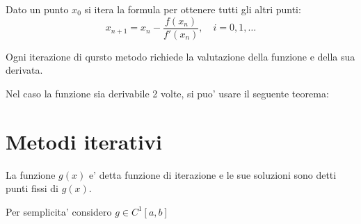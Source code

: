 Dato un punto $x_0$ si itera la formula per ottenere tutti gli altri punti:
\begin{equation}
  x_{n+1} = x_n - \frac{f(x_n)}{f'(x_n)}, \quad i = 0, 1, \dots
\end{equation}

Ogni iterazione di qursto metodo richiede la valutazione della funzione e della sua derivata.


Nel caso la funzione sia derivabile 2 volte, si puo' usare il seguente teorema:

\section{Metodi iterativi}
La funzione $g(x)$ e' detta funzione di iterazione e le sue soluzioni sono detti punti fissi
di $g(x)$.

Per semplicita' considero $g\in C^1[a, b]$
